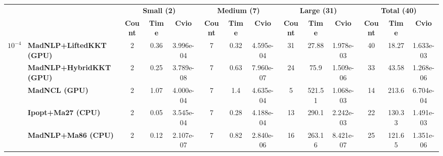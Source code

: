 \begin{center}
\renewcommand{\arraystretch}{0.9}
\begin{tabular}{|l|l|ccc|ccc|ccc|ccc|}
\hline
 & & \multicolumn{3}{c|}{\textbf{Small (2)}} & \multicolumn{3}{c|}{\textbf{Medium (7)}} & \multicolumn{3}{c|}{\textbf{Large (31)}} & \multicolumn{3}{c|}{\textbf{Total (40)}} \\
 & & \textbf{Count} & \textbf{Time} & \textbf{Cvio} & \textbf{Count} & \textbf{Time} & \textbf{Cvio} & \textbf{Count} & \textbf{Time} & \textbf{Cvio} & \textbf{Count} & \textbf{Time} & \textbf{Cvio}\\
\hline
\multirow{5}{*}{\Large\textbf{$10^{-4}$}} & \textbf{MadNLP+LiftedKKT (GPU)} & \cellcolor{blue!15}2 & 0.36 & 3.996e-04 & \cellcolor{blue!15}7 & 0.32 & 4.595e-04 & \cellcolor{blue!15}31 & \cellcolor{blue!15}27.88 & 1.978e-03 & \cellcolor{blue!15}40 & \cellcolor{blue!15}18.27 & 1.633e-03 \\
 & \textbf{MadNLP+HybridKKT (GPU)} & \cellcolor{blue!15}2 & 0.25 & \cellcolor{blue!15}3.789e-08 & \cellcolor{blue!15}7 & 0.63 & \cellcolor{blue!15}7.960e-07 & 24 & 75.9 & 1.509e-06 & 33 & 43.58 & \cellcolor{blue!15}1.268e-06 \\
 & \textbf{MadNCL (GPU)} & \cellcolor{blue!15}2 & 1.07 & 4.000e-04 & \cellcolor{blue!15}7 & 1.4 & 4.635e-04 & 5 & 521.51 & 1.068e-03 & 14 & 213.6 & 6.704e-04 \\
 & \textbf{Ipopt+Ma27 (CPU)} & \cellcolor{blue!15}2 & \cellcolor{blue!15}0.05 & 3.545e-04 & \cellcolor{blue!15}7 & \cellcolor{blue!15}0.28 & 4.188e-04 & 13 & 290.1 & 2.242e-03 & 22 & 130.33 & 1.491e-03 \\
 & \textbf{MadNLP+Ma86 (CPU)} & \cellcolor{blue!15}2 & 0.12 & 2.107e-07 & \cellcolor{blue!15}7 & 0.82 & 2.840e-06 & 16 & 263.16 & \cellcolor{blue!15}8.421e-07 & 25 & 121.65 & 1.351e-06 \\
\hline
\end{tabular}
\end{center}
